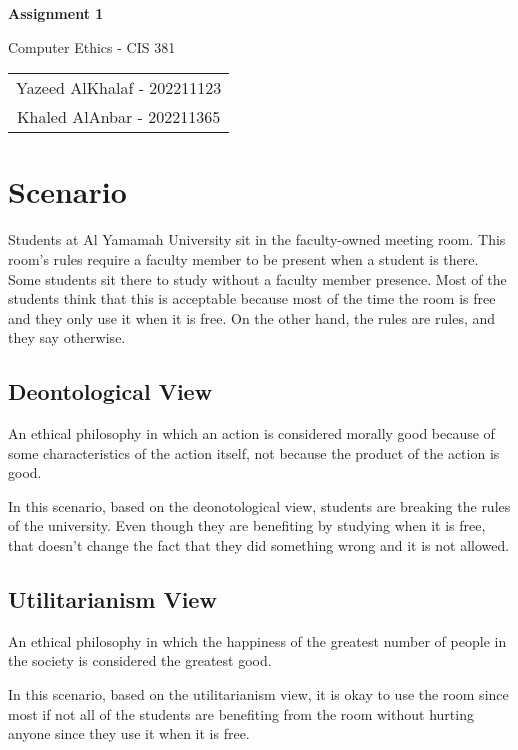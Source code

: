 \documentclass[12pt]{article}
\begin{document}
\begin{center}
    {\huge\textbf{Assignment 1}}
    \vspace{1em}
    
    {\large Computer Ethics - CIS 381}
    \vspace{2em}
    
    \begin{tabular}{c}
    Yazeed AlKhalaf - 202211123 \\
    Khaled AlAnbar - 202211365
    \end{tabular}
    \vspace{2em}
\end{center}

\section{Scenario}

Students at Al Yamamah University sit in the faculty-owned meeting room. This room's rules require a faculty member to be present when a student is there. Some students sit there to study without a faculty member presence. Most of the students think that this is acceptable because most of the time the room is free and they only use it when it is free. On the other hand, the rules are rules, and they say otherwise.

\subsection{Deontological View}

\begin{mdframed}[style=rounded]
An ethical philosophy in which an action is considered morally good because of some characteristics of the action itself, not because the product of the action is good.
\end{mdframed}

In this scenario, based on the deonotological view, students are breaking the rules of the university. Even though they are benefiting by studying when it is free, that doesn't change the fact that they did something wrong and it is not allowed.

\subsection{Utilitarianism View}

\begin{mdframed}[style=rounded]
An ethical philosophy in which the happiness of the greatest number of people in the society is considered the greatest good.
\end{mdframed}

In this scenario, based on the utilitarianism view, it is okay to use the room since most if not all of the students are benefiting from the room without hurting anyone since they use it when it is free.
\end{document}
